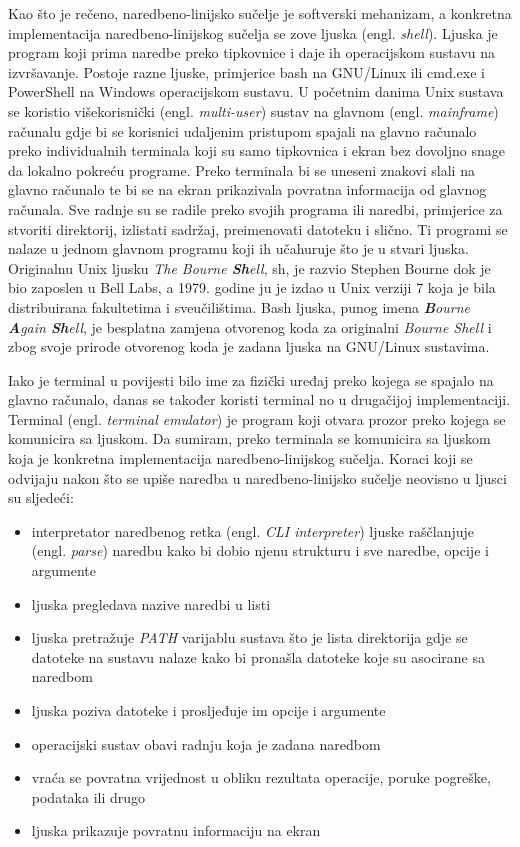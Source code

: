 \documentclass{foi}
\begin{document}
Kao što je rečeno, naredbeno-linijsko sučelje je softverski mehanizam, a konkretna implementacija naredbeno-linijskog sučelja se zove ljuska (engl. \textit{shell}). Ljuska je program koji prima naredbe preko tipkovnice i daje ih operacijskom sustavu na izvršavanje.\cite{LinuxCommand} Postoje razne ljuske, primjerice bash na GNU/Linux ili cmd.exe i PowerShell na Windows operacijskom sustavu.\cite{AWSShell} U početnim danima Unix sustava se koristio višekorisnički (engl. \textit{multi-user}) sustav na glavnom (engl. \textit{mainframe}) računalu gdje bi se korisnici udaljenim pristupom spajali na glavno računalo preko individualnih terminala koji su samo tipkovnica i ekran bez dovoljno snage da lokalno pokreću programe. Preko terminala bi se uneseni znakovi slali na glavno računalo te bi se na ekran prikazivala povratna informacija od glavnog računala. Sve radnje su se radile preko svojih programa ili naredbi, primjerice za stvoriti direktorij, izlistati sadržaj, preimenovati datoteku i slično. Ti programi se nalaze u jednom glavnom programu koji ih učahuruje što je u stvari ljuska.\cite{UbuntuShell} Originalnu Unix ljusku \textit{The Bourne \textbf{Sh}ell}, sh, je razvio Stephen Bourne dok je bio zaposlen u Bell Labs, a 1979. godine ju je izdao u Unix verziji 7 koja je bila distribuirana fakultetima i sveučilištima. Bash ljuska, punog imena \textit{\textbf{B}ourne \textbf{A}gain \textbf{Sh}ell}, je besplatna zamjena otvorenog koda za originalni \textit{Bourne Shell} i zbog svoje prirode otvorenog koda je zadana ljuska na GNU/Linux sustavima.\cite{ShellHistory}
\begin{flushleft}
    Iako je terminal u povijesti bilo ime za fizički uređaj preko kojega se spajalo na glavno računalo, danas se također koristi terminal no u drugačijoj implementaciji. Terminal (engl. \textit{terminal emulator}) je program koji otvara prozor preko kojega se komunicira sa ljuskom.\cite{LinuxCommand} Da sumiram, preko terminala se komunicira sa ljuskom koja je konkretna implementacija naredbeno-linijskog sučelja. Koraci koji se odvijaju nakon što se upiše naredba u naredbeno-linijsko sučelje neovisno u ljusci su sljedeći\cite{AWSShell}:
\begin{itemize}
    \item interpretator naredbenog retka (engl. \textit{CLI interpreter}) ljuske raščlanjuje (engl. \textit{parse}) naredbu kako bi dobio njenu strukturu i sve naredbe, opcije i argumente
    \item ljuska pregledava nazive naredbi u listi
    \item ljuska pretražuje \textit{PATH} varijablu sustava što je lista direktorija gdje se datoteke na sustavu nalaze kako bi pronašla datoteke koje su asocirane sa naredbom
    \item ljuska poziva datoteke i prosljeđuje im opcije i argumente
    \item operacijski sustav obavi radnju koja je zadana naredbom
    \item vraća se povratna vrijednost u obliku rezultata operacije, poruke pogreške, podataka ili drugo
    \item ljuska prikazuje povratnu informaciju na ekran
\end{itemize}
\end{flushleft}
\end{document}
